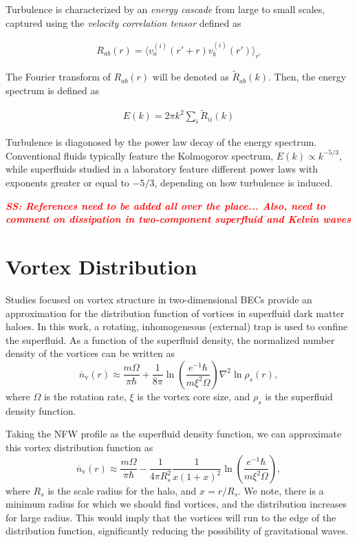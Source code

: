 \documentclass[onecolumn,nofootinbib,superscriptaddress]{revtex4}
\newcommand{\stst}[1]{\textcolor{red}{\it{\textbf{SS: #1}}} }
\begin{document}
Turbulence is characterized by an \textit{energy cascade} from large to small scales, captured using the \textit{velocity correlation tensor} defined as

\begin{align}
R_{a b}(r) = \langle v^{(i)}_a(r' + r) v^{(i)}_b(r') \rangle_{r'}
\end{align}
 
The Fourier transform of $R_{a b}(r)$ will be denoted as $\tilde{R}_{a b}(k)$. Then, the energy spectrum is defined as

\begin{align}
E(k) = 2 \pi k^2 \sum_i \tilde{R}_{i i}(k) 
\end{align}

Turbulence is diagonosed by the power law decay of the energy spectrum. Conventional fluids typically feature the Kolmogorov spectrum, $E(k) \propto k^{-5/3}$, while superfluids studied in a laboratory feature different power laws with exponents greater or equal to $-5/3$, depending on how turbulence is induced.

\stst{References need to be added all over the place... Also, need to comment on dissipation in two-component superfluid and Kelvin waves}


\section{Vortex Distribution}

Studies focused on vortex structure in two-dimensional BECs \cite{Aftalion:2001,Sheehy:2004} provide an approximation for the distribution function of vortices in superfluid dark matter haloes.  In this work, a rotating, inhomogeneous (external) trap is used to confine the superfluid.  As a function of the superfluid density, the normalized number density of the vortices can be written \cite{Sheehy:2004} as
\begin{equation}
\overline{n}_\text{v}(r) \approx \frac{m\Omega}{\pi\hbar} + \frac{1}{8\pi}\ln \left(\frac{e^{-1}\hbar}{m\xi^2 \Omega}\right)\nabla^2 \ln \rho_s(r),
\end{equation}
where $\Omega$ is the rotation rate, $\xi$ is the vortex core size, and $\rho_s$ is the superfluid density function.

Taking the NFW profile \cite{Navarro:1995iw} as the superfluid density function, we can approximate this vortex distribution function as
\begin{equation}
\overline{n}_\text{v}(r) \approx \frac{m\Omega}{\pi\hbar} - \frac{1}{4\pi R_s^2}\frac{1}{x(1+x)^2}\ln \left(\frac{e^{-1}\hbar}{m\xi^2 \Omega}\right),
\end{equation}
where $R_s$ is the scale radius for the halo, and $x = r/R_s$.  We note, there is a minimum radius for which we should find vortices, and the distribution increases for large radius.  This would imply that the vortices will run to the edge of the distribution function, significantly reducing the possibility of gravitational waves.
\end{document}
